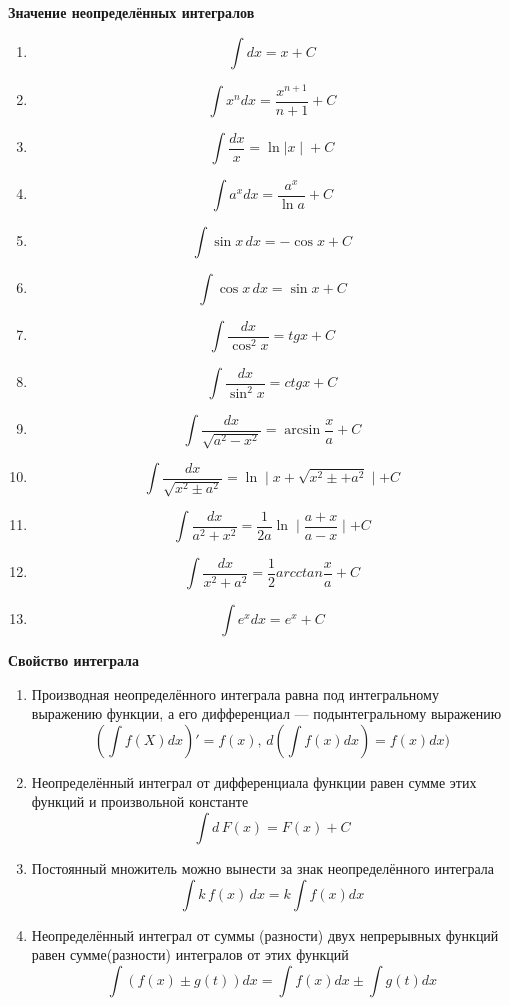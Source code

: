 \documentclass[a5paper]{article}
\begin{document}
	\newpage
	\begin{center}
	\textbf{Значение неопределённых интегралов}
	\end{center}
	\begin{enumerate} 
	\item	\[\int dx = x + C\]	 
	\item	\[\int x^{n}dx = \dfrac{x^{n+1}}{n+1} + C\]
	\item	\[\int\dfrac{dx}{x} = \ln{\mid x \mid} + C\]
	\item	\[\int a^{x}dx = \dfrac{a^{x}}{\ln a} + C\]
	\item	\[\int\sin x\,dx = -\cos x + C\]
	\item	\[\int\cos x\,dx = \sin x + C\]
	\item	\[\int\dfrac{dx}{\cos^{2}x} = tg x + C\]
	\item	\[\int\dfrac{dx}{\sin^{2}x} = ctg x + C\]
	\item	\[\int\dfrac{dx}{\sqrt{a^2 - x^2}} = \arcsin\dfrac{x}{a} + C\]
	\item	\[\int\dfrac{dx}{\sqrt{x^2 \pm a^2}} = \ln \mid x + \sqrt{x^2 \pm + a^2} \mid + C\]
	\item	\[\int\dfrac{dx}{a^2 + x^2} = \dfrac{1}{2a}\ln \mid\dfrac{a+x}{a-x}\mid + C\]
	\item	\[\int\dfrac{dx}{x^2 + a^2} = \dfrac{1}{2}arcctan\dfrac{x}{a} + C\]
	\item	\[\int e^x dx= e^x + C\]
	\end{enumerate}
	
	\newpage
	\begin{center}
		\textbf{Свойство интеграла}
	\end{center}
	\begin{enumerate}
		\item Производная неопределённого интеграла равна под интегральному выражению функции, а его дифференциал --- подынтегральному выражению \[ (\int f(X) dx)' = f(x), \, d(\int f(x)dx) = f(x)dx) \]
		\item Неопределённый интеграл от дифференциала функции равен сумме этих функций и произвольной константе \[ \int d\,F(x) = F(x) + C \] 
		\item Постоянный множитель можно вынести за знак неопределённого интеграла \[ \int k\,f(x)\,dx = k \int f(x)dx\]
		\item Неопределённый интеграл от суммы (разности) двух непрерывных функций равен сумме(разности) интегралов от этих функций \[ \int (f(x) \pm g(t))dx = \int f(x)dx \pm \int g(t)dx \]
	\end{enumerate}
	\newpage
\end{document}
